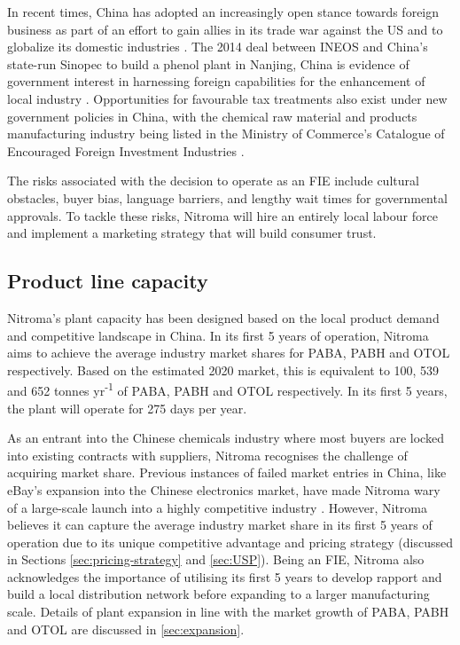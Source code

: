 In recent times, China has adopted an increasingly open stance towards foreign business as part of an effort to gain allies in its trade war against the US and to globalize its domestic industries \cite{cheng_chinas_2020}. The 2014 deal between INEOS and China’s state-run Sinopec to build a phenol plant in Nanjing, China is evidence of government interest in harnessing foreign capabilities for the enhancement of local industry \cite{pwc_new_2011}. Opportunities for favourable tax treatments also exist under new government policies in China, with the chemical raw material and products manufacturing industry being listed in the Ministry of Commerce’s Catalogue of Encouraged Foreign Investment Industries \cite{ministry_of_commerce_china_catalouge_2020}. 

The risks associated with the decision to operate as an FIE include cultural obstacles, buyer bias, language barriers, and lengthy wait times for governmental approvals. To tackle these risks, Nitroma will hire an entirely local labour force and implement a marketing strategy that will build consumer trust.

\subsection{Product line capacity}
\label{sec:product-capacity}
Nitroma’s plant capacity has been designed based on the local product demand and competitive landscape in China. In its first 5 years of operation, Nitroma aims to achieve the average industry market shares for PABA, PABH and OTOL respectively. Based on the estimated 2020 market, this is equivalent to 100, 539 and 652 tonnes yr\textsuperscript{-1} of PABA, PABH and OTOL respectively. In its first 5 years, the plant will operate for 275 days per year.

As an entrant into the Chinese chemicals industry where most buyers are locked into existing contracts with suppliers, Nitroma recognises the challenge of acquiring market share. Previous instances of failed market entries in China, like eBay’s expansion into the Chinese electronics market, have made Nitroma wary of a large-scale launch into a highly competitive industry \cite{obrien_4_2015}. However, Nitroma believes it can capture the average industry market share in its first 5 years of operation due to its unique competitive advantage and pricing strategy (discussed in Sections \ref{sec:pricing-strategy} and \ref{sec:USP}). Being an FIE, Nitroma also acknowledges the importance of utilising its first 5 years to develop rapport and build a local distribution network before expanding to a larger manufacturing scale. Details of plant expansion in line with the market growth of PABA, PABH and OTOL are discussed in \cref{sec:expansion}.

